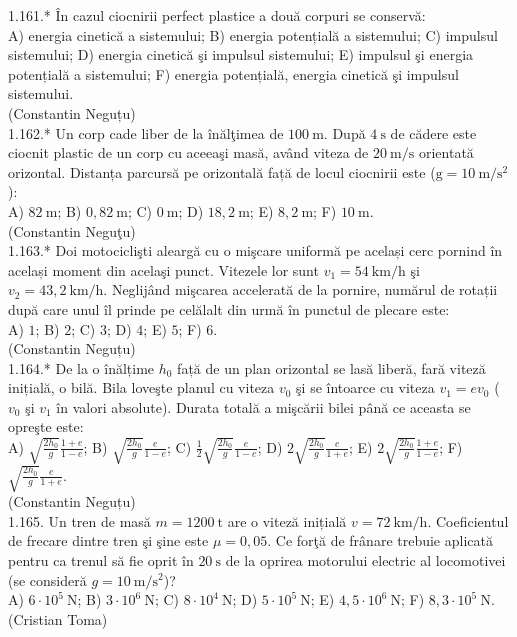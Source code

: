 1.161.* În cazul ciocnirii perfect plastice a două corpuri se conservă:\\ A) energia cinetică a sistemului; B) energia potențială a sistemului; C) impulsul sistemului; D) energia cinetică şi impulsul sistemului; E) impulsul şi energia potențială a sistemului; F) energia potențială, energia cinetică şi impulsul sistemului.\\ (Constantin Neguțu)\\

1.162.* Un corp cade liber de la înălţimea de $100 \mathrm{~m}$. După $4 \mathrm{~s}$ de cădere este ciocnit plastic de un corp cu aceeaşi masă, având viteza de $20 \mathrm{~m} / \mathrm{s}$ orientată orizontal. Distanța parcursă pe orizontală față de locul ciocnirii este ($\mathrm{g}=10 \mathrm{~m} / \mathrm{s}^{2}$):\\ A) $82 \mathrm{~m}$; B) $0,82 \mathrm{~m}$; C) $0 \mathrm{~m}$; D) $18,2 \mathrm{~m}$; E) $8,2 \mathrm{~m}$; F) $10 \mathrm{~m}$.\\ (Constantin Neguţu)\\

1.163.* Doi motociclişti aleargă cu o mişcare uniformă pe același cerc pornind în același moment din acelaşi punct. Vitezele lor sunt $v_{1}=54 \mathrm{~km} / \mathrm{h}$ şi $v_{2}=43,2 \mathrm{~km} / \mathrm{h}$. Neglijând mişcarea accelerată de la pornire, numărul de rotații după care unul îl prinde pe celălalt din urmă în punctul de plecare este:\\ A) $1$; B) $2$; C) $3$; D) $4$; E) $5$; F) $6$.\\ (Constantin Neguțu)\\

1.164.* De la o înălțime $h_{0}$ față de un plan orizontal se lasă liberă, fară viteză inițială, o bilă. Bila loveşte planul cu viteza $v_{0}$ şi se întoarce cu viteza $v_{1}=e v_{0}$ ($v_{0}$ şi $v_{1}$ în valori absolute). Durata totală a mişcării bilei până ce aceasta se opreşte este:\\ A) $\sqrt{\frac{2 h_{0}}{g}} \frac{1+e}{1-e}$; B) $\sqrt{\frac{2 h_{0}}{g}} \frac{e}{1-e}$; C) $\frac{1}{2} \sqrt{\frac{2 h_{0}}{g}} \frac{e}{1-e}$; D) $2 \sqrt{\frac{2 h_{0}}{g}} \frac{e}{1+e}$; E) $2 \sqrt{\frac{2 h_{0}}{g}} \frac{1+e}{1-e}$; F) $\sqrt{\frac{2 h_{0}}{g}} \frac{e}{1+e}$.\\ (Constantin Neguțu)\\

1.165. Un tren de masă $m=1200 \mathrm{~t}$ are o viteză inițială $v=72 \mathrm{~km} / \mathrm{h}$. Coeficientul de frecare dintre tren şi şine este $\mu=0,05$. Ce forţă de frânare trebuie aplicată pentru ca trenul să fie oprit în $20 \mathrm{~s}$ de la oprirea motorului electric al locomotivei (se consideră $g=10 \mathrm{~m} / \mathrm{s}^{2}$)?\\ A) $6 \cdot 10^{5} \mathrm{~N}$; B) $3 \cdot 10^{6} \mathrm{~N}$; C) $8 \cdot 10^{4} \mathrm{~N}$; D) $5 \cdot 10^{5} \mathrm{~N}$; E) $4,5 \cdot 10^{6} \mathrm{~N}$; F) $8,3 \cdot 10^{5} \mathrm{~N}$.\\ (Cristian Toma)\\

